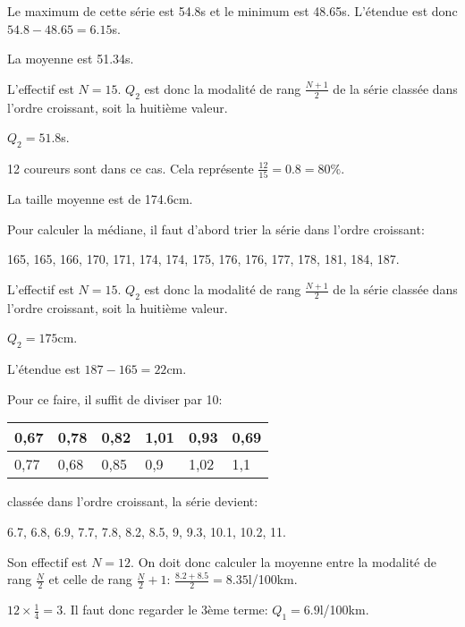 \documentclass[a4paper,12pt]{scrartcl}
\begin{document}
\exo{}

\question{}
Le maximum de cette série est 54.8s et le minimum est 48.65s. L'étendue est donc $54.8-48.65=6.15$s.

\question{}
La moyenne est 51.34s.

\question{}
L'effectif est $N = 15$. $Q_2$ est donc la modalité de rang $\frac{N+1}{2}$ de la série classée dans l'ordre croissant, soit la huitième valeur.

$Q_2 = 51.8$s.

\question{}
12 coureurs sont dans ce cas. Cela représente $\frac{12}{15} = 0.8 = 80\%$.

\exo{}

\question{}
La taille moyenne est de 174.6cm.

\question{}
Pour calculer la médiane, il faut d'abord trier la série dans l'ordre croissant:

165, 165, 166, 170, 171, 174, 174, 175, 176, 176, 177, 178, 181, 184, 187.

L'effectif est $N = 15$. $Q_2$ est donc la modalité de rang $\frac{N+1}{2}$ de la série classée dans l'ordre croissant, soit la huitième valeur.

$Q_2 = 175$cm.

\question{}
L'étendue est $187-165 = 22$cm.


\exo{}

\question{}
Pour ce faire, il suffit de diviser par 10: 

\begin{center}
\begin{tabular}{|l|l|l|l|l|l|}\hline
0,67 & 0,78 & 0,82 & 1,01 & 0,93 & 0,69\\\hline
0,77 & 0,68 & 0,85 & 0,9 & 1,02 & 1,1\\\hline
\end{tabular}
\end{center}


classée dans l'ordre croissant, la série devient:

6.7, 6.8, 6.9, 7.7, 7.8, 8.2, 8.5, 9, 9.3, 10.1, 10.2, 11.

Son effectif est $N = 12$. On doit donc calculer la moyenne entre la modalité de rang $\frac{N}{2}$ et celle de rang $\frac{N}{2}+1$: $\frac{8.2+8.5}{2} = 8.35$l/100km.


$12 \times \frac{1}{4} = 3$. Il faut donc regarder le 3ème terme: $Q_1 = 6.9$l/100km.
\end{document}
